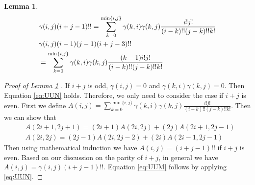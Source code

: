 \documentclass[conference]{IEEEtran}
\newtheorem{lemma}{Lemma}
\def\E{\mathbb{E}}
\newcommand{\ide}[2]{ \gamma(#1,#2) }
\begin{document}

\begin{lemma}\label{lemma:UUN}
    \begin{align}
        &\ide{i}{j} (i+j-1)!! = \sum_{k=0}^{\min\{i, j\}}
        \ide{k}{i} \ide{k}{j} \frac{i! j!}{(i-k)!!(j-k)!! k!} \label{eq:UUN} \\
             &   \ide{i}{j}(i-1)(j-1)(i+j-3)!!  \notag\\
        &=\sum_{k=0}^{\min\{i, j\}}
        \ide{k}{i} \ide{k}{j} \frac{(k-1)i!j!}{(i-k)!!(j-k)!!k!} \label{eq:UUM}
    \end{align}
\end{lemma}
\begin{proof}[Proof of Lemma \ref{lemma:UUN} ]
	If $ i + j $ is odd, $ \ide{i}{j} = 0 $ and
	$ \ide{k}{i}\ide{k}{j} = 0 $. Then Equation \eqref{eq:UUN} holds.
	Therefore, we only need to consider the case if $ i + j $ is even.
	First we define $A(i, j) = \sum_{k=0}^{\min\{i, j\}}
	\ide{k}{i} \ide{k}{j} \frac{i! j!}{(i-k)!!(j-k)!! k!}$.
	Then we can show that
	\begin{align*}
	& A(2i+1, 2j+1) = (2i + 1) A(2i, 2j) + (2j) A(2i+1, 2j-1)\\
	& A(2i, 2j)= (2j - 1) A(2i, 2j-2) + (2i) A(2i-1, 2j-1) 
	\end{align*}
	Then using mathematical induction we have $A(i,j) = (i+j-1)!!$ if $i + j $ is even.
	Based on our discussion on the parity of $i+j$, in general we have $A(i,j)=\ide{i}{j}(i+j-1)!!$.
	Equation \eqref{eq:UUM} follows by applying \eqref{eq:UUN}.
\end{proof}
\end{document}
